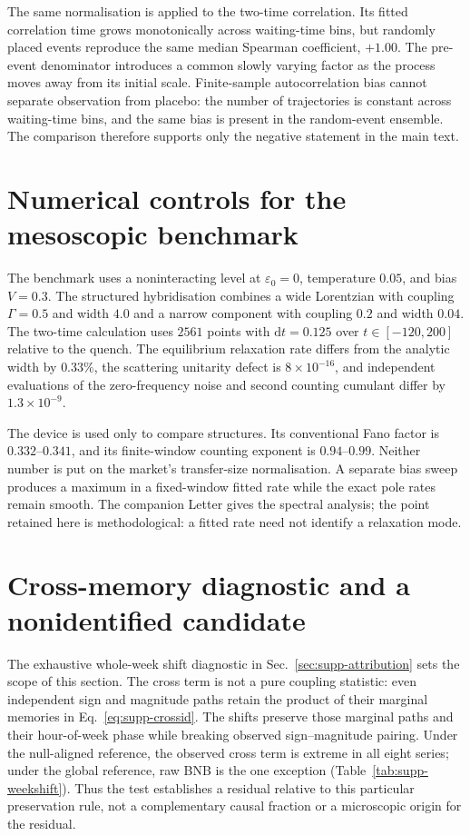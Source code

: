 \documentclass[aps,pre,onecolumn,superscriptaddress,floatfix,nofootinbib]{revtex4-2}
\newcommand{\eps}{\varepsilon}
\begin{document}
The same normalisation is applied to the two-time correlation. Its fitted
correlation time grows monotonically across waiting-time bins, but randomly
placed events reproduce the same median Spearman coefficient, $+1.00$. The
pre-event denominator introduces a common slowly varying factor as the process
moves away from its initial scale. Finite-sample autocorrelation bias cannot
separate observation from placebo: the number of trajectories is constant
across waiting-time bins, and the same bias is present in the random-event
ensemble. The comparison therefore supports only the negative statement in
the main text.

\section{Numerical controls for the mesoscopic benchmark}

The benchmark uses a noninteracting level at $\eps_0=0$, temperature $0.05$,
and bias $V=0.3$. The structured hybridisation combines a wide Lorentzian with
coupling $\Gamma=0.5$ and width $4.0$ and a narrow component with coupling
$0.2$ and width $0.04$. The two-time calculation uses $2561$ points with
$\mathrm{d}t=0.125$ over $t\in[-120,200]$ relative to the quench. The
equilibrium relaxation rate differs from the analytic width by $0.33\%$, the
scattering unitarity defect is $8\times10^{-16}$, and independent evaluations
of the zero-frequency noise and second counting cumulant differ by
$1.3\times10^{-9}$.

The device is used only to compare structures. Its conventional Fano factor is
$0.332$--$0.341$, and its finite-window counting exponent is $0.94$--$0.99$.
Neither number is put on the market's transfer-size normalisation. A separate
bias sweep produces a maximum in a fixed-window fitted rate while the exact
pole rates remain smooth. The companion Letter gives the spectral analysis;
the point retained here is methodological: a fitted rate need not identify a
relaxation mode.

\section{Cross-memory diagnostic and a nonidentified candidate}

The exhaustive whole-week shift diagnostic in Sec.~\ref{sec:supp-attribution}
sets the scope of this section. The cross term is not a pure coupling
statistic: even independent sign and magnitude paths retain the product of
their marginal memories in Eq.~\eqref{eq:supp-crossid}. The shifts preserve
those marginal paths and their hour-of-week phase while breaking observed
sign--magnitude pairing. Under the null-aligned reference, the observed cross
term is extreme in all eight series; under the global reference, raw BNB is the
one exception (Table~\ref{tab:supp-weekshift}). Thus the test establishes a
residual relative to this particular preservation rule, not a complementary
causal fraction or a microscopic origin for the residual.
\end{document}
